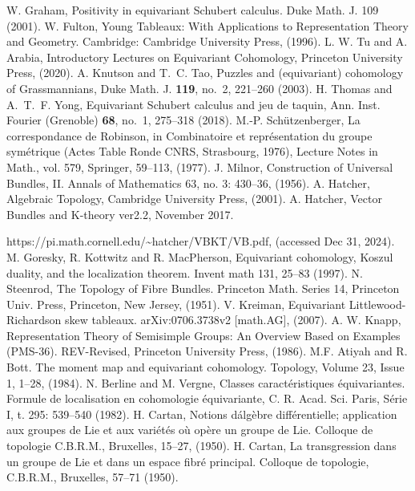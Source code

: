 \begin{thebibliography}{99}
  
   W. Graham, Positivity in equivariant Schubert calculus. Duke Math. J. 109 (2001).
   W. Fulton, Young Tableaux: With Applications to Representation Theory and Geometry. Cambridge: Cambridge University Press, (1996).
   L. W. Tu and A. Arabia, Introductory Lectures on Equivariant Cohomology, Princeton University Press, (2020).
   A. Knutson and T.~C. Tao, Puzzles and (equivariant) cohomology of Grassmannians, Duke Math. J. {\bf 119}, no.~2, 221--260  (2003).
   H. Thomas and A.~T.~F. Yong, Equivariant Schubert calculus and jeu de taquin, Ann. Inst. Fourier (Grenoble) {\bf 68}, no.~1, 275--318 (2018). 
  M.-P. Schützenberger, La correspondance de Robinson, in Combinatoire et
  repr\'esentation du groupe sym\'etrique (Actes Table Ronde CNRS, Strasbourg, 1976),
  Lecture Notes in Math., vol. 579, Springer, 59--113, (1977).
   J. Milnor, Construction of Universal Bundles, II. Annals of Mathematics 63, no. 3: 430--36, (1956).
   A. Hatcher, Algebraic Topology, Cambridge University Press, (2001).
   A. Hatcher, Vector Bundles and K-theory ver2.2, November 2017. 
  
  https://pi.math.cornell.edu/\textasciitilde hatcher/VBKT/VB.pdf, (accessed Dec 31, 2024).
   M. Goresky, R. Kottwitz and R. MacPherson, Equivariant cohomology, Koszul duality, and the localization theorem. Invent math 131, 25--83 (1997).
   N. Steenrod, The Topology of Fibre Bundles. Princeton Math. Series 14,
  Princeton Univ. Press, Princeton, New Jersey, (1951).
   V. Kreiman, Equivariant Littlewood-Richardson skew tableaux. arXiv:0706.3738v2 [math.AG], (2007).
   A. W. Knapp, Representation Theory of Semisimple Groups: An Overview Based on Examples (PMS-36). REV-Revised, Princeton University Press, (1986). 
   M.F. Atiyah and R. Bott.
  The moment map and equivariant cohomology.
  Topology,
  Volume 23, Issue 1, 1--28, (1984).
   N. Berline and M. Vergne, Classes caract\'eristiques \'equivariantes. Formule
  de localisation en cohomologie \'equivariante, C. R. Acad. Sci. Paris, S\'erie
  I, t. 295: 539--540 (1982).
  H. Cartan, Notions d\'alg\`ebre diff\' erentielle; application aux groupes de Lie et aux vari\'et\' es o\`u op\`ere un
  groupe de Lie. Colloque de topologie C.B.R.M., Bruxelles, 15--27, (1950).
  H. Cartan, La transgression dans un groupe de Lie et dans un espace fibr\'e principal. Colloque de
  topologie, C.B.R.M., Bruxelles, 57--71 (1950).
\end{thebibliography}